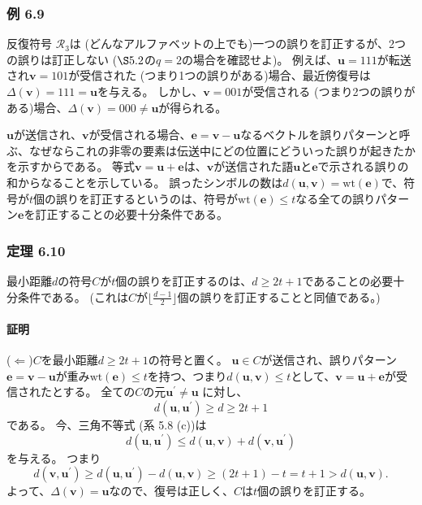 \documentclass[12pt,a4paper]{article}
\begin{document}
\subsubsection*{例 6.9}

反復符号 $\mathcal{R}_3$は (どんなアルファベットの上でも)一つの誤りを訂正するが、2つの誤りは訂正しない ($\S 5.2$の$q=2$の場合を確認せよ)。
例えば、$\mathbf{u} = 111$が転送され$\mathbf{v} = 101$が受信された (つまり1つの誤りがある)場合、最近傍復号は$\Delta (\mathbf{v}) = 111 = \mathbf{u}$を与える。
しかし、$\mathbf{v} = 001$が受信される (つまり2つの誤りがある)場合、$\Delta (\mathbf{v}) = 000 \neq \mathbf{u}$が得られる。

$\mathbf{u}$が送信され、$\mathbf{v}$が受信される場合、$\mathbf{e} = \mathbf{v} - \mathbf{u}$なるベクトルを誤りパターンと呼ぶ、なぜならこれの非零の要素は伝送中にどの位置にどういった誤りが起きたかを示すからである。
等式$\mathbf{v} = \mathbf{u} + \mathbf{e}$は、$\mathbf{v}$が送信された語$\mathbf{u}$と$\mathbf{e}$で示される誤りの和からなることを示している。
誤ったシンボルの数は$d(\mathbf{u}, \mathbf{v}) = \text{wt} (\mathbf{e})$で、符号が$t$個の誤りを訂正するというのは、符号が$\text{wt} (\mathbf{e}) \leq t$なる全ての誤りパターン$\mathbf{e}$を訂正することの必要十分条件である。

\subsubsection*{定理 6.10}

最小距離$d$の符号$C$が$t$個の誤りを訂正するのは、$d \geq 2t + 1 $であることの必要十分条件である。
(これは$C$が$\lfloor \frac{d-1}{2} \rfloor$個の誤りを訂正することと同値である。)

\paragraph{証明}

($\Leftarrow$)$C$を最小距離$d \geq 2t + 1$の符号と置く。
$\mathbf{u} \in C$が送信され、誤りパターン$\mathbf{e} = \mathbf{v} - \mathbf{u}$が重み$\text{wt} (\mathbf{e}) \leq t$を持つ、つまり$d(\mathbf{u}, \mathbf{v}) \leq t$として、$\mathbf{v} = \mathbf{u} + \mathbf{e}$が受信されたとする。
全ての$C$の元$\mathbf{u}^\prime \neq \mathbf{u}$ に対し、
$$
d(\mathbf{u}, \mathbf{u}^\prime) \geq d \geq 2t + 1
$$
である。
今、三角不等式 (系 5.8 (c))は
$$
d(\mathbf{u}, \mathbf{u}^\prime) \leq d(\mathbf{u}, \mathbf{v}) + d(\mathbf{v}, \mathbf{u}^\prime)
$$
を与える。
つまり
$$
d(\mathbf{v}, \mathbf{u}^\prime) \geq d(\mathbf{u}, \mathbf{u}^\prime) - d(\mathbf{u}, \mathbf{v}) \geq (2t + 1) - t = t + 1 > d(\mathbf{u}, \mathbf{v}).
$$
よって、$\Delta (\mathbf{v}) = \mathbf{u}$なので、復号は正しく、$C$は$t$個の誤りを訂正する。
\end{document}
